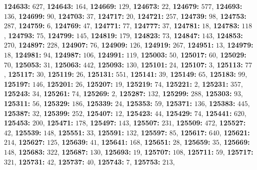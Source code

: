 \textsf{\bfseries 124633:} $627$, \textsf{\bfseries 124643:} $164$, \textsf{\bfseries 124669:} $129$, \textsf{\bfseries 124673:} $22$, \textsf{\bfseries 124679:} $577$, \textsf{\bfseries 124693:} $136$, \textsf{\bfseries 124699:} $90$, \textsf{\bfseries 124703:} $37$, \textsf{\bfseries 124717:} $20$, \textsf{\bfseries 124721:} $257$, \textsf{\bfseries 124739:} $98$, \textsf{\bfseries 124753:} $287$, \textsf{\bfseries 124759:} $6$, \textsf{\bfseries 124769:} $47$, \textsf{\bfseries 124771:} $77$, \textsf{\bfseries 124777:} $37$, \textsf{\bfseries 124781:} $18$, \textsf{\bfseries 124783:} $118$, \textsf{\bfseries 124793:} $75$, \textsf{\bfseries 124799:} $145$, \textsf{\bfseries 124819:} $179$, \textsf{\bfseries 124823:} $73$, \textsf{\bfseries 124847:} $143$, \textsf{\bfseries 124853:} $270$, \textsf{\bfseries 124897:} $228$, \textsf{\bfseries 124907:} $76$, \textsf{\bfseries 124909:} $126$, \textsf{\bfseries 124919:} $267$, \textsf{\bfseries 124951:} $13$, \textsf{\bfseries 124979:} $18$, \textsf{\bfseries 124981:} $94$, \textsf{\bfseries 124987:} $106$, \textsf{\bfseries 124991:} $119$, \textsf{\bfseries 125003:} $50$, \textsf{\bfseries 125017:} $60$, \textsf{\bfseries 125029:} $70$, \textsf{\bfseries 125053:} $31$, \textsf{\bfseries 125063:} $442$, \textsf{\bfseries 125093:} $130$, \textsf{\bfseries 125101:} $24$, \textsf{\bfseries 125107:} $3$, \textsf{\bfseries 125113:} $77$, \textsf{\bfseries 125117:} $30$, \textsf{\bfseries 125119:} $26$, \textsf{\bfseries 125131:} $551$, \textsf{\bfseries 125141:} $39$, \textsf{\bfseries 125149:} $65$, \textsf{\bfseries 125183:} $99$, \textsf{\bfseries 125197:} $146$, \textsf{\bfseries 125201:} $26$, \textsf{\bfseries 125207:} $19$, \textsf{\bfseries 125219:} $74$, \textsf{\bfseries 125221:} $2$, \textsf{\bfseries 125231:} $357$, \textsf{\bfseries 125243:} $34$, \textsf{\bfseries 125261:} $74$, \textsf{\bfseries 125269:} $2$, \textsf{\bfseries 125287:} $132$, \textsf{\bfseries 125299:} $288$, \textsf{\bfseries 125303:} $93$, \textsf{\bfseries 125311:} $56$, \textsf{\bfseries 125329:} $186$, \textsf{\bfseries 125339:} $24$, \textsf{\bfseries 125353:} $59$, \textsf{\bfseries 125371:} $136$, \textsf{\bfseries 125383:} $445$, \textsf{\bfseries 125387:} $32$, \textsf{\bfseries 125399:} $252$, \textsf{\bfseries 125407:} $12$, \textsf{\bfseries 125423:} $44$, \textsf{\bfseries 125429:} $74$, \textsf{\bfseries 125441:} $620$, \textsf{\bfseries 125453:} $200$, \textsf{\bfseries 125471:} $178$, \textsf{\bfseries 125497:} $143$, \textsf{\bfseries 125507:} $231$, \textsf{\bfseries 125509:} $472$, \textsf{\bfseries 125527:} $42$, \textsf{\bfseries 125539:} $148$, \textsf{\bfseries 125551:} $33$, \textsf{\bfseries 125591:} $132$, \textsf{\bfseries 125597:} $85$, \textsf{\bfseries 125617:} $640$, \textsf{\bfseries 125621:} $214$, \textsf{\bfseries 125627:} $125$, \textsf{\bfseries 125639:} $41$, \textsf{\bfseries 125641:} $168$, \textsf{\bfseries 125651:} $28$, \textsf{\bfseries 125659:} $35$, \textsf{\bfseries 125669:} $148$, \textsf{\bfseries 125683:} $322$, \textsf{\bfseries 125687:} $130$, \textsf{\bfseries 125693:} $19$, \textsf{\bfseries 125707:} $108$, \textsf{\bfseries 125711:} $59$, \textsf{\bfseries 125717:} $321$, \textsf{\bfseries 125731:} $42$, \textsf{\bfseries 125737:} $40$, \textsf{\bfseries 125743:} $7$, \textsf{\bfseries 125753:} $213$, 
